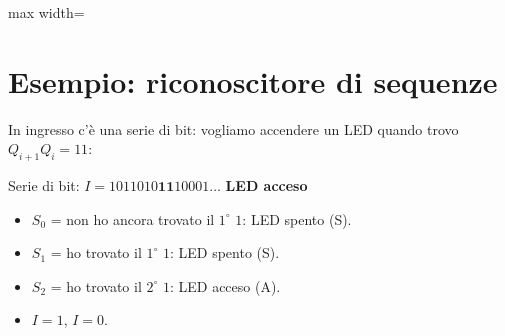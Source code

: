 \documentclass[11pt,a4paper]{report}
\newenvironment{fitcenter}{%
  \begin{center}%
  \begin{adjustbox}{max width=\linewidth}%
}{%
  \end{adjustbox}%
  \end{center}%
}
\begin{document}
\begin{fitcenter}
\begin{tikzpicture}[scale=0.82, every node/.style={scale=0.82}]
\end{tikzpicture}
\end{fitcenter}

\section{Esempio: riconoscitore di sequenze}

In ingresso c'è una serie di bit: vogliamo accendere un LED quando trovo $Q_{i+1}Q_i=11$:

\medskip
\noindent Serie di bit: $I = 1011010\mathbf{11}10001\ldots$ \quad \textbf{LED acceso}

\begin{itemize}[leftmargin=1.5em]
    \item $S_0$ = non ho ancora trovato il $1^\circ$ $1$: LED spento (S).
    \item $S_1$ = ho trovato il $1^\circ$ $1$: LED spento (S).
    \item $S_2$ = ho trovato il $2^\circ$ $1$: LED acceso (A).
    \item $I=1$, $I=0$.
\end{itemize}
\end{document}
